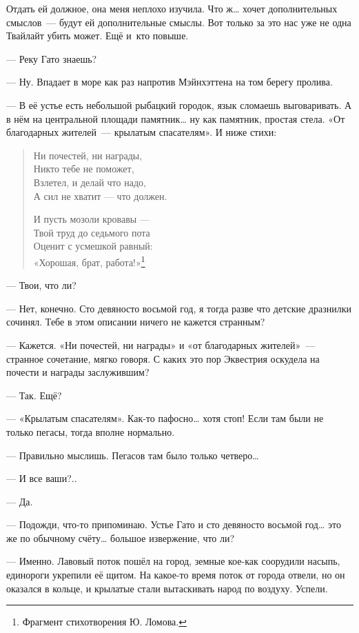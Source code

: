 \documentclass[fontsize=11pt,a5paper,titlepage=firstcover]{scrbook}
\begin{document}
Отдать ей должное, она меня неплохо изучила. Что ж{\ldots} хочет дополнительных смыслов~--- будут ей дополнительные смыслы. Вот только за это нас уже не одна Твайлайт убить может. Ещё и~кто повыше.

--- Реку Гато знаешь?

--- Ну. Впадает в море как раз напротив Мэйнхэттена на том берегу пролива.

--- В её устье есть небольшой рыбацкий городок, язык сломаешь выговаривать. А в нём на центральной площади памятник{\ldots} ну как памятник, простая стела. «От благодарных жителей~--- крылатым спасателям». И ниже стихи:

\begin{verse}
\textsf{Ни почестей, ни награды,\\
Никто тебе не поможет,\\
Взлетел, и делай что надо,\\
А сил не хватит --- что должен.}

\textsf{И пусть мозоли кровавы ---\\
Твой труд до седьмого пота\\
Оценит с усмешкой равный:\\
«Хорошая, брат, работа!»}\footnote{Фрагмент стихотворения Ю. Ломова.}
\end{verse}

--- Твои, что ли?

--- Нет, конечно. Сто девяносто восьмой год, я тогда разве что детские дразнилки сочинял. Тебе в этом описании ничего не кажется странным?

--- Кажется. «Ни почестей, ни награды» и «от благодарных жителей»~--- странное сочетание, мягко говоря. С каких это пор Эквестрия оскудела на почести и награды заслужившим?

--- Так. Ещё?

--- «Крылатым спасателям». Как-то пафосно{\ldots} хотя стоп! Если там были не только пегасы, тогда вполне нормально.

--- Правильно мыслишь. Пегасов там было только четверо{\ldots}

--- И все ваши?..

--- Да.

--- Подожди, что-то припоминаю. Устье Гато и сто девяносто восьмой год{\ldots} это же по обычному счёту{\ldots} большое извержение, что ли?

--- Именно. Лавовый поток пошёл на город, земные кое-как соорудили насыпь, единороги укрепили её щитом. На какое-то время поток от города отвели, но он оказался в кольце, и крылатые стали вытаскивать народ по воздуху. Успели.
\end{document}
